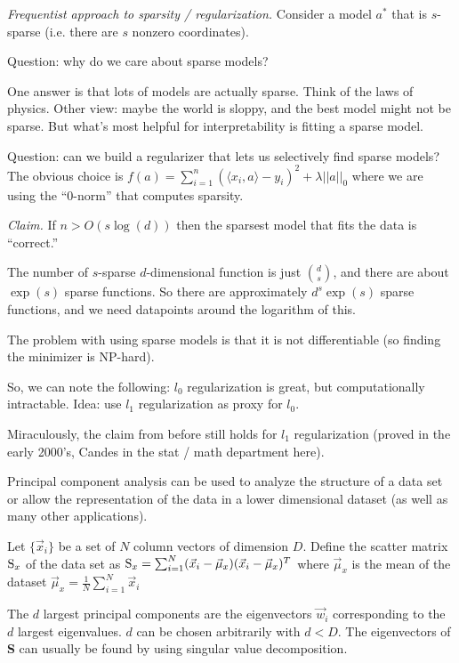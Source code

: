 \documentclass[8pt]{article}
\newlength{\norm}
\begin{document}
{\it Frequentist approach to sparsity / regularization.} Consider a model $a^{*}$ that is $s$-sparse (i.e. there are $s$ nonzero coordinates).  

Question: why do we care about sparse models?

   One answer is that lots of models are actually sparse.  Think of the laws of physics.
   Other view: maybe the world is sloppy, and the best model might not be sparse.  But what's most helpful for interpretability is fitting a sparse model.

Question: can we build a regularizer that lets us selectively find sparse models?  The obvious choice is $f(a) = \sum_{i=1}^{n} \left( \langle x_i, a \rangle - y_i \right)^2 + \lambda ||a||_0$
where we are using the ``0-norm'' that computes sparsity.

{\it Claim.} If $n > O (s \log (d))$ then the sparsest model that fits the data is ``correct.''

The number of $s$-sparse $d$-dimensional function is just $\binom{d}{s}$, and there are about $\exp(s)$ sparse functions.  So there are approximately $d^s \exp(s)$ sparse functions, and we need datapoints around the logarithm of this.

The problem with using sparse models is that it is not differentiable (so finding the minimizer is NP-hard).

So, we can note the following: $l_0$ regularization is great, but computationally intractable. Idea: use $l_1$ regularization as proxy for $l_0$.

Miraculously, the claim from before still holds for $l_1$ regularization (proved in the early 2000's, Candes in the stat / math department here).


Principal component analysis can be used to analyze the structure
of a data set or allow the representation of the data in a lower
dimensional dataset (as well as many other applications).

Let $\{ \vec{x}_i \}$ be a set of $N$ column vectors of dimension $D$.
Define the scatter matrix ${\bf \rm S}_x$ of the data set as ${\bf \rm S}_x = \sum^N_{i=1} ( \vec{x}_i - \vec{\mu}_x )( \vec{x}_i - \vec{\mu}_x )^{T}$ where $\vec{\mu}_x$ is the mean of the dataset $\vec{\mu}_x = \frac{1}{N} \sum^N_{i=1} \vec{x}_i$

The $d$ largest principal components are the eigenvectors
$\vec{w}_i$ corresponding to the $d$ largest eigenvalues.
$d$ can be chosen arbitrarily with $d < D$.
The eigenvectors of {\bf S} can usually be found by using 
singular value decomposition.
\end{document}
